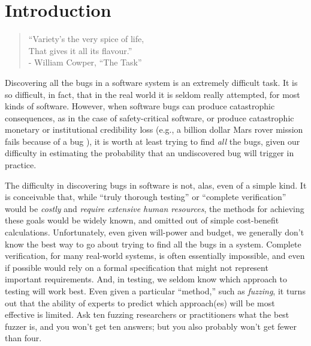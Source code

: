 \documentclass[sigplan,review]{acmart}
\begin{document}



\maketitle

\section{Introduction}

\begin{quote}
  ``Variety's the very spice of life,\\
  That gives it all its flavour.''
  \\ - William Cowper, ``The Task''
  \end{quote}

Discovering all the bugs in a software system is an extremely
difficult task.  It is so difficult, in fact, that in the real world
it is seldom really attempted, for most kinds of software.  However,
when software bugs can produce catastrophic consequences, as in the
case of safety-critical software, or produce catastrophic monetary or
institutional credibility
loss (e.g., a billion dollar Mars rover mission fails because of a bug
\cite{Spirit}), it is worth at least trying to find \emph{all} the bugs,
given our difficulty in estimating the probability that an
undiscovered bug will trigger in practice.

The difficulty in discovering bugs in software is not, alas, even of
a simple kind.  It is conceivable that, while ``truly thorough testing'' or
``complete verification'' would be \emph{costly} and \emph{require
  extensive human resources}, the methods for achieving these goals
would be widely known, and omitted out of simple cost-benefit
calculations.  Unfortunately, even given will-power and budget, we
generally don't know the best way to go about trying to find all the
bugs in a system.  Complete verification, for many real-world systems,
is often essentially impossible, and even if possible would rely on a
formal specification that might not represent important requirements.
And, in testing, we seldom know which approach to testing will work
best.  Even given a particular ``method,'' such as \emph{fuzzing}, it
turns out that the ability of experts to predict which approach(es)
will be most effective is limited.  Ask ten fuzzing researchers or
practitioners what the best fuzzer is, and you won't get ten answers;
but you also probably won't get fewer than four.
\end{document}
